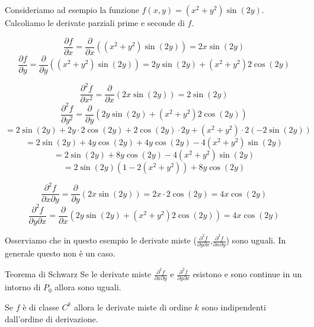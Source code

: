 Consideriamo ad esempio la funzione $f(x,y) = (x^2 + y^2)\sin(2y)$. Calcoliamo le derivate parziali prime e seconde di $f$.


\[
\frac{\partial f}{\partial x} = \frac{\partial}{\partial x} \left( (x^2 + y^2)\sin(2y) \right) = 2x\sin(2y)
\]
\[
\frac{\partial f}{\partial y} = \frac{\partial}{\partial y} \left( (x^2 + y^2)\sin(2y) \right) = 2y\sin(2y) + (x^2 + y^2)2\cos(2y)
\]

\[
\frac{\partial^2 f}{\partial x^2} = \frac{\partial}{\partial x} \left( 2x\sin(2y) \right) = 2\sin(2y)
\]
\[
\frac{\partial^2 f}{\partial y^2} = \frac{\partial}{\partial y} \left( 2y\sin(2y) + (x^2 + y^2)2\cos(2y) \right)
\]
\[
= 2\sin(2y) + 2y \cdot 2\cos(2y) + 2\cos(2y) \cdot 2y + (x^2 + y^2) \cdot 2(-2\sin(2y))
\]
\[
= 2\sin(2y) + 4y\cos(2y) + 4y\cos(2y) - 4(x^2 + y^2)\sin(2y)
\]
\[
= 2\sin(2y) + 8y\cos(2y) - 4(x^2 + y^2)\sin(2y)
\]
\[
= 2\sin(2y)(1 - 2(x^2 + y^2)) + 8y\cos(2y)
\]

\[
\frac{\partial^2 f}{\partial x \partial y} = \frac{\partial}{\partial y} \left( 2x\sin(2y) \right) = 2x \cdot 2\cos(2y) = 4x\cos(2y)
\]
\[
\frac{\partial^2 f}{\partial y \partial x} = \frac{\partial}{\partial x} \left( 2y\sin(2y) + (x^2 + y^2)2\cos(2y) \right) = 4x\cos(2y)
\]

Osserviamo che in questo esempio le derivate miste ($\frac{\partial^2 f}{\partial y \partial x}$,$\frac{\partial^2 f}{\partial x \partial y}$) sono uguali. In generale questo non è un caso.

\begin{teorema}{Teorema di Schwarz}
  Se le derivate miste $\frac{\partial^2 f}{\partial x \partial y}$ e $\frac{\partial^2 f}{\partial y \partial x}$ esistono e sono continue in un intorno di $P_0$ allora sono uguali.
\end{teorema}

\begin{corollario}{}
  Se $f$ è di classe $C^k$ allora le derivate miste di ordine $k$ sono indipendenti dall'ordine di derivazione.
\end{corollario}

